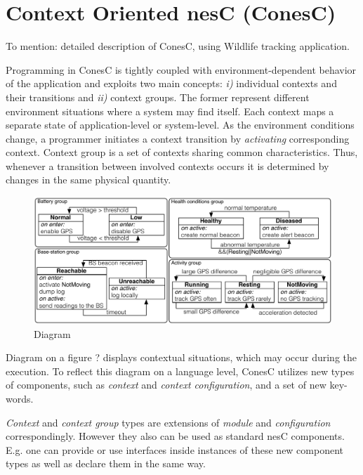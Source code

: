 \section{Context Oriented nesC (ConesC)}
To mention: detailed description of ConesC, using Wildlife tracking application.

Programming in ConesC is tightly coupled with environment-dependent behavior of the application and exploits two main concepts: \emph{i)} individual contexts and their transitions and \emph{ii)} context groups. The former represent different environment situations where a system may find itself. Each context maps a separate state of application-level or system-level. As the environment conditions change, a programmer initiates a context transition by \emph{activating} corresponding context. Context group is a set of contexts sharing common characteristics. Thus, whenever a transition between involved contexts occurs it is determined by changes in the same physical quantity.

\begin{figure}[!h]
\centering
\includegraphics[width=\columnwidth]{pdf/wildlifetracking}
\caption{Diagram}
\label{fig:wtd}
\end{figure}

Diagram on a figure ? displays contextual situations, which may occur during the execution. To reflect this diagram on a language level, ConesC utilizes new types of components, such as \emph{context} and \emph{context configuration}, and a set of new key-words.

\emph{Context} and \emph{context group} types are extensions of \emph{module} and \emph{configuration} correspondingly. However they also can be used as standard nesC components. E.g. one can provide or use interfaces inside instances of these new component types as well as declare them in the same way.  

